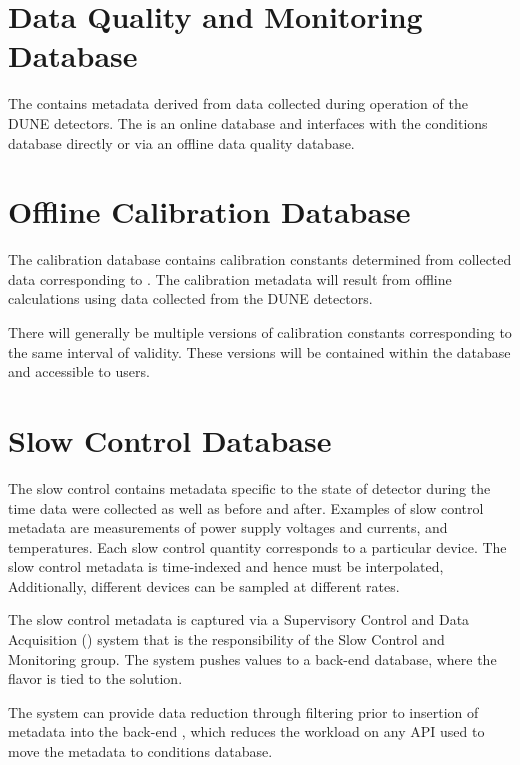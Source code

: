 \documentclass[../main-v1.tex]{subfiles}
\begin{document}
\section{Data Quality and Monitoring Database  }
\label{sec:db:dqm}  

The  contains metadata derived from data collected during operation of the DUNE detectors. The   is an online database and interfaces with the conditions database directly or via an offline data quality database. 

\section{Offline Calibration Database  }
\label{sec:db:calib} 

The calibration database contains calibration constants determined from collected data corresponding to  . The calibration metadata will result from offline calculations using data collected from the DUNE detectors.

There will generally be multiple versions of calibration constants corresponding to the same interval of validity. These versions will be contained within the database and accessible to users.  

\section{Slow Control Database }
\label{sec:db:slowcontrol}  

The slow control  contains metadata specific to the state of detector during the time data were collected as well as before and after. Examples of slow control metadata are measurements of power supply voltages and currents, and temperatures. Each slow control quantity corresponds to a particular device. The slow control  metadata is time-indexed and hence must be interpolated, Additionally, different devices can be sampled at different rates.

The slow control metadata is captured via a Supervisory Control and Data Acquisition () system that is the responsibility of the Slow Control and Monitoring group. The   system pushes values to a back-end database, where the  flavor is tied to the  solution. 

The   system can provide data reduction through filtering prior to insertion of metadata into the back-end , which reduces the workload on any API used to move the metadata to conditions database. 
\end{document}
